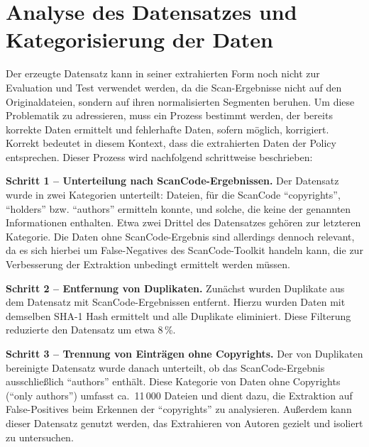 \section{Analyse des Datensatzes und Kategorisierung der Daten}\label{sec:analyse-datensatz}

Der erzeugte Datensatz kann in seiner extrahierten Form noch nicht zur Evaluation und Test verwendet werden, da die Scan-Ergebnisse nicht auf den Originaldateien, sondern auf ihren normalisierten Segmenten beruhen.
Um diese Problematik zu adressieren, muss ein Prozess bestimmt werden, der bereits korrekte Daten ermittelt und fehlerhafte Daten, sofern möglich, korrigiert.
Korrekt bedeutet in diesem Kontext, dass die extrahierten Daten der Policy entsprechen.
Dieser Prozess wird nachfolgend schrittweise beschrieben:

\textbf{Schritt 1 -- Unterteilung nach ScanCode-Ergebnissen.}
Der Datensatz wurde in zwei Kategorien unterteilt: Dateien, für die ScanCode \enquote{copyrights}, \enquote{holders} bzw. \enquote{authors} ermitteln konnte, und solche, die keine der genannten Informationen enthalten.
Etwa zwei Drittel des Datensatzes gehören zur letzteren Kategorie.
Die Daten ohne ScanCode-Ergebnis sind allerdings dennoch relevant, da es sich hierbei um False-Negatives des ScanCode-Toolkit handeln kann, die zur Verbesserung der Extraktion unbedingt ermittelt werden müssen.

\textbf{Schritt 2 -- Entfernung von Duplikaten.}
Zunächst wurden Duplikate aus dem Datensatz mit ScanCode-Ergebnissen entfernt.
Hierzu wurden Daten mit demselben SHA-1 Hash ermittelt und alle Duplikate eliminiert.
Diese Filterung reduzierte den Datensatz um etwa 8\,\%.

\textbf{Schritt 3 -- Trennung von Einträgen ohne Copyrights.}
Der von Duplikaten bereinigte Datensatz wurde danach unterteilt, ob das ScanCode-Ergebnis ausschließlich \enquote{authors} enthält.
Diese Kategorie von Daten ohne Copyrights (\enquote{only authors}) umfasst ca.\ 11\,000 Dateien und dient dazu, die Extraktion auf False-Positives beim Erkennen der \enquote{copyrights} zu analysieren.
Außerdem kann dieser Datensatz genutzt werden, das Extrahieren von Autoren gezielt und isoliert zu untersuchen.

